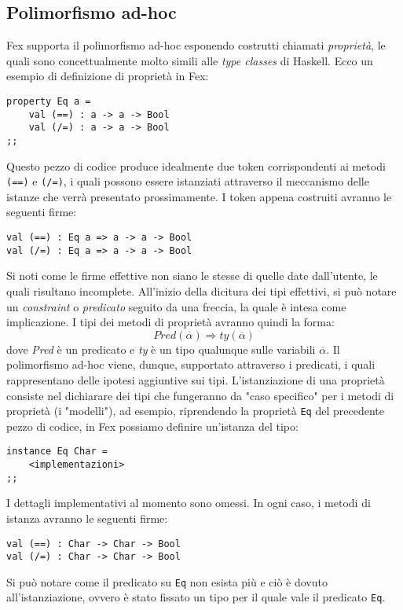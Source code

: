 \documentclass[10pt,a4paper]{article}
\begin{document}
\hypertarget{Polimorfismo ad-hoc}{\subsection{Polimorfismo ad-hoc}}
Fex supporta il polimorfismo ad-hoc esponendo costrutti chiamati \textit{proprietà}, le quali sono concettualmente
molto simili alle \textit{type classes} di Haskell. Ecco un esempio di definizione di proprietà in Fex:
\begin{lstlisting}
property Eq a =
    val (==) : a -> a -> Bool
    val (/=) : a -> a -> Bool
;;
\end{lstlisting}
Questo pezzo di codice produce idealmente due token corrispondenti ai metodi \texttt{(==)} e \texttt{(/=)},
i quali possono essere istanziati attraverso il meccanismo delle istanze che verrà presentato prossimamente. I token
appena costruiti avranno le seguenti firme:
\begin{lstlisting}
val (==) : Eq a => a -> a -> Bool
val (/=) : Eq a => a -> a -> Bool
\end{lstlisting}
Si noti come le firme effettive non siano le stesse di quelle date dall'utente, le quali risultano incomplete.
All'inizio della dicitura dei tipi effettivi, si può notare un \textit{constraint} o \textit{predicato} seguito da una
freccia, la quale è intesa come implicazione. I tipi dei metodi di proprietà avranno quindi la forma:
    \[ Pred(\overline{\alpha}) \Rightarrow ty(\overline{\alpha}) \]
dove \textit{Pred} è un predicato e \textit{ty} è un tipo qualunque sulle variabili $ \overline{\alpha} $.
Il polimorfismo ad-hoc viene, dunque, supportato attraverso i predicati, i quali rappresentano delle ipotesi aggiuntive
sui tipi. L'istanziazione di una proprietà consiste nel dichiarare dei tipi che fungeranno da "caso specifico" per i
metodi di proprietà (i "modelli"), ad esempio, riprendendo la proprietà \texttt{Eq} del precedente pezzo di codice,
in Fex possiamo definire un'istanza del tipo:
\begin{lstlisting}
instance Eq Char =
    <implementazioni>
;;
\end{lstlisting}
I dettagli implementativi al momento sono omessi. In ogni caso, i metodi di istanza avranno le seguenti firme:
\begin{lstlisting}
val (==) : Char -> Char -> Bool
val (/=) : Char -> Char -> Bool
\end{lstlisting}
Si può notare come il predicato su \texttt{Eq} non esista più e ciò è dovuto all'istanziazione, ovvero è stato fissato
un tipo per il quale vale il predicato \texttt{Eq}.
\end{document}
